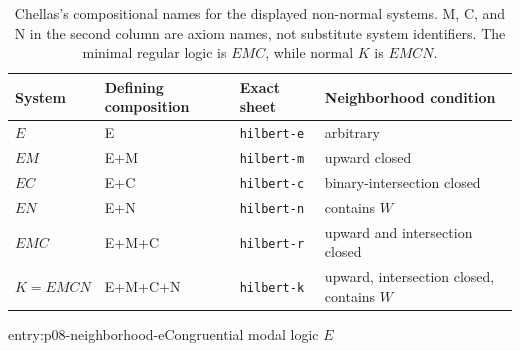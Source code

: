 \begin{table}[!htbp]
\centering
\small
\begin{tabular}{@{}p{}p{}p{}p{}@{}}
\toprule
System & Defining composition & Exact sheet & Neighborhood condition \\
\midrule
\(E\) & E & \texttt{hilbert-e} & arbitrary \\
\(EM\) & E+M & \texttt{hilbert-m} & upward closed \\
\(EC\) & E+C & \texttt{hilbert-c} & binary-intersection closed \\
\(EN\) & E+N & \texttt{hilbert-n} & contains \(W\) \\
\(EMC\) & E+M+C & \texttt{hilbert-r} & upward and intersection closed \\
\(K=EMCN\) & E+M+C+N & \texttt{hilbert-k} & upward, intersection closed, contains \(W\) \\
\bottomrule
\end{tabular}
\caption{Chellas's compositional names for the displayed non-normal systems.
M, C, and N in the second column are axiom names, not substitute system
identifiers.  The minimal regular logic is \(EMC\), while normal \(K\) is
\(EMCN\).}
\label{tab:p08-neighborhood-systems}
\end{table}

\begin{systementry}{entry:p08-neighborhood-e}{Congruential modal logic \(E\)}
\end{systementry}

